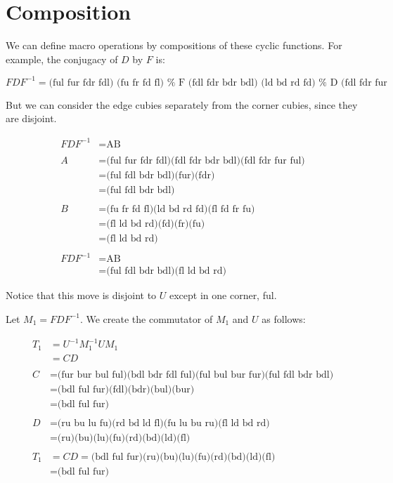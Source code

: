\section{Composition}

We can define macro operations by compositions of these cyclic
functions.  For example, the conjugacy of $D$ by $F$ is:

\begin{displaymath}
    FDF^{-1}
  = \text{(ful fur fdr fdl) (fu fr fd fl)     %
          (fdl fdr bdr bdl) (ld bd rd fd)     %
          (fdl fdr fur ful) (fl fd fr fu)}    %
\end{displaymath}

But we can consider the edge cubies separately from the corner cubies,
since they are disjoint.

\begin{align*}
  FDF^{-1} &= \text{AB} \\
  &       \\
  A
  &= \text{(ful fur fdr fdl)(fdl fdr bdr bdl)(fdl fdr fur ful)} \\
  &= \text{(ful fdl bdr bdl)(fur)(fdr)} \\
  &= \text{(ful fdl bdr bdl)} \\
  & \\
  B
  &= \text{(fu fr fd fl)(ld bd rd fd)(fl fd fr fu)} \\
  &= \text{(fl ld bd rd)(fd)(fr)(fu)} \\
  &= \text{(fl ld bd rd)} \\
  & \\
  FDF^{-1}
  &= \text{AB} \\
  &= \text{(ful fdl bdr bdl)(fl ld bd rd)}
\end{align*}

Notice that this move is disjoint to $U$ except in one corner, ful.

Let $M_1 = FDF^{-1}$.  We create the commutator of $M_1$ and $U$ as
follows:

\begin{align*}
  T_1
  &= U^{-1}M_1^{-1}UM_1 \\
  &= CD \\
  & \\
  C
  &= \text{(fur bur bul ful)(bdl bdr fdl ful)(ful bul bur fur)(ful fdl bdr bdl)} \\
  &= \text{(bdl ful fur)(fdl)(bdr)(bul)(bur)} \\
  &= \text{(bdl ful fur)} \\
  & \\
  D
  &= \text{(ru bu lu fu)(rd bd ld fl)(fu lu bu ru)(fl ld bd rd)} \\
  &= \text{(ru)(bu)(lu)(fu)(rd)(bd)(ld)(fl)} \\
  & \\
  T_1
  &= CD = \text{(bdl ful fur)(ru)(bu)(lu)(fu)(rd)(bd)(ld)(fl)} \\
  &= \text{(bdl ful fur)} \\
\end{align*}
  
